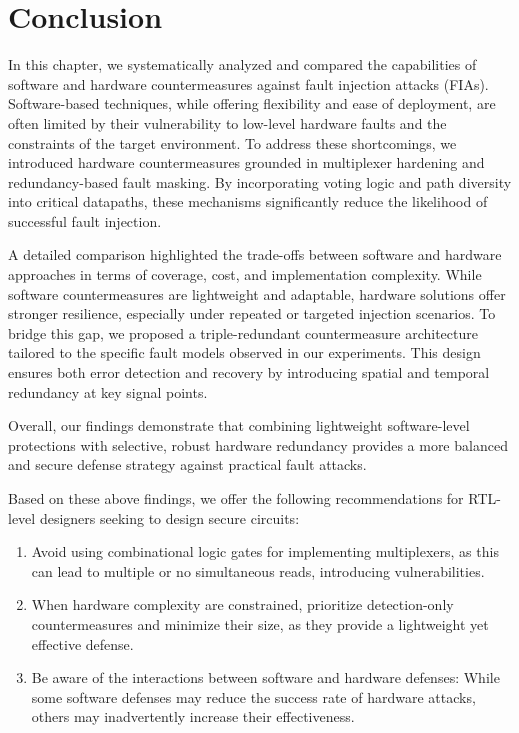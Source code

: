 \section{Conclusion}
In this chapter, we systematically analyzed and compared the capabilities of software and hardware countermeasures against fault injection attacks (FIAs). Software-based techniques, while offering flexibility and ease of deployment, are often limited by their vulnerability to low-level hardware faults and the constraints of the target environment. To address these shortcomings, we introduced hardware countermeasures grounded in multiplexer hardening and redundancy-based fault masking. By incorporating voting logic and path diversity into critical datapaths, these mechanisms significantly reduce the likelihood of successful fault injection.

A detailed comparison highlighted the trade-offs between software and hardware approaches in terms of coverage, cost, and implementation complexity. While software countermeasures are lightweight and adaptable, hardware solutions offer stronger resilience, especially under repeated or targeted injection scenarios. To bridge this gap, we proposed a triple-redundant countermeasure architecture tailored to the specific fault models observed in our experiments. This design ensures both error detection and recovery by introducing spatial and temporal redundancy at key signal points.

Overall, our findings demonstrate that combining lightweight software-level protections with selective, robust hardware redundancy provides a more balanced and secure defense strategy against practical fault attacks.

Based on these above findings, we offer the following recommendations for RTL-level designers seeking to design secure circuits:
\begin{enumerate}
\item Avoid using combinational logic gates for implementing multiplexers, as this can lead to multiple or no simultaneous reads, introducing vulnerabilities.
\item When hardware complexity are constrained, prioritize detection-only countermeasures and minimize their size, as they provide a lightweight yet effective defense.
\item Be aware of the interactions between software and hardware defenses: While some software defenses may reduce the success rate of hardware attacks, others may inadvertently increase their effectiveness.
\end{enumerate}